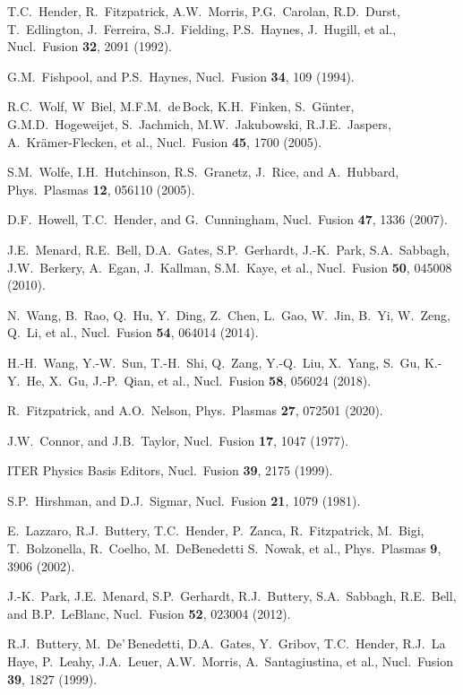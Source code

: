 \documentclass[12pt,prb,aps]{revtex4-1}
\begin{document}
\begin{thebibliography}{99}
 T.C.~Hender, R.~Fitzpatrick, A.W.~Morris, P.G.~Carolan, R.D.~Durst, T.~Edlington, J.~Ferreira, 
S.J.~Fielding, P.S.~Haynes, J.~Hugill, et al., Nucl.\ Fusion {\bf 32}, 2091 (1992).

 G.M.~Fishpool, and P.S.~Haynes, Nucl.\ Fusion {\bf 34}, 109 (1994).

 R.C.~Wolf, W~Biel, M.F.M.~de\,Bock, K.H.~Finken, S.~G\"{u}nter, G.M.D.~Hogeweijet,  S.~Jachmich, M.W.~Jakubowski, R.J.E.~Jaspers, A.~Kr\"{a}mer-Flecken, et al., Nucl.\ Fusion {\bf 45}, 1700 (2005).

 S.M.~Wolfe,  I.H.~Hutchinson, R.S.~Granetz, J.~Rice, and A.~Hubbard, Phys.\ Plasmas {\bf 12}, 056110 (2005).

 D.F.~Howell, T.C.~Hender, and G.~Cunningham, Nucl.\ Fusion {\bf 47}, 1336 (2007).

 J.E.~Menard, R.E.~Bell, D.A.~Gates, S.P.~Gerhardt, J.-K.~Park, S.A.~Sabbagh, J.W.~Berkery,
A.~Egan, J.~Kallman, S.M.~Kaye, et al., Nucl.\ Fusion {\bf 50}, 045008 (2010).

 N.~Wang, B.~Rao, Q.~Hu, Y.~Ding, Z.~Chen, L.~Gao, W.~Jin, B.~Yi, W.~Zeng, Q.~Li, et al., Nucl.\ Fusion {\bf 54}, 064014 (2014).

 H.-H.~Wang, Y.-W.~Sun, T.-H.~Shi, Q.~Zang, Y.-Q.~Liu, X.~Yang, 
S.~Gu, K.-Y.~He, X.~Gu, J.-P.~Qian, et al., Nucl.\ Fusion {\bf 58}, 056024 (2018).

 R.~Fitzpatrick, and A.O.~Nelson,  Phys.\ Plasmas {\bf 27}, 072501 (2020).

 J.W.~Connor, and J.B.~Taylor, Nucl.\ Fusion {\bf 17}, 1047 (1977).

 ITER Physics Basis Editors, Nucl.\ Fusion {\bf 39}, 2175 (1999). 

 S.P.~Hirshman, and D.J.~Sigmar, Nucl.\ Fusion {\bf 21}, 1079 (1981). 

 E.~Lazzaro, R.J.~Buttery, T.C.~Hender, P.~Zanca, R.~Fitzpatrick, 
M.~Bigi, T.~Bolzonella, R.~Coelho, M.~DeBenedetti S.~Nowak, et al., Phys.\ Plasmas {\bf 9}, 3906 (2002).

 J.-K.~Park, J.E.~Menard, S.P.~Gerhardt, R.J.~Buttery, S.A.~Sabbagh, R.E.~Bell, and B.P.~LeBlanc, Nucl.\ Fusion {\bf 52}, 023004 (2012).

 R.J.~Buttery, M.~De'\,Benedetti, D.A.~Gates, Y.~Gribov, T.C.~Hender, R.J.~La\,Haye, P.~Leahy, 
J.A.~Leuer, A.W.~Morris, A.~Santagiustina, et al., Nucl.\ Fusion {\bf 39}, 1827 (1999).


\end{thebibliography}
\end{document}
